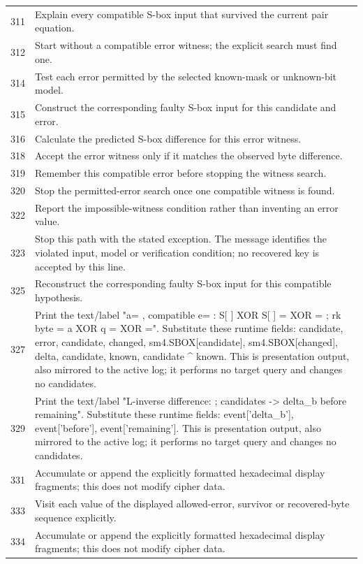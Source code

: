 \begin{longtable}{r >{\raggedright\arraybackslash}p{138mm}}
311&Explain every compatible S-box input that survived the current pair equation.\\
312&Start without a compatible error witness; the explicit search must find one.\\
314&Test each error permitted by the selected known-mask or unknown-bit model.\\
315&Construct the corresponding faulty S-box input for this candidate and error.\\
316&Calculate the predicted S-box difference for this error witness.\\
318&Accept the error witness only if it matches the observed byte difference.\\
319&Remember this compatible error before stopping the witness search.\\
320&Stop the permitted-error search once one compatible witness is found.\\
322&Report the impossible-witness condition rather than inventing an error value.\\
323&Stop this path with the stated exception. The message identifies the violated input, model or verification condition; no recovered key is accepted by this line.\\
325&Reconstruct the corresponding faulty S-box input for this compatible hypothesis.\\
327&Print the text/label "a= , compatible e= : S[ ] XOR S[ ] =   XOR   =  ; rk byte = a XOR q =   XOR   =". Substitute these runtime fields: candidate, error, candidate, changed, sm4.SBOX[candidate], sm4.SBOX[changed], delta, candidate, known, candidate \textasciicircum{} known. This is presentation output, also mirrored to the active log; it performs no target query and changes no candidates.\\
329&Print the text/label "L-inverse difference:  ; candidates   ->  delta\_b before remaining". Substitute these runtime fields: event['delta\_b'], event['before'], event['remaining']. This is presentation output, also mirrored to the active log; it performs no target query and changes no candidates.\\
331&Accumulate or append the explicitly formatted hexadecimal display fragments; this does not modify cipher data.\\
333&Visit each value of the displayed allowed-error, survivor or recovered-byte sequence explicitly.\\
334&Accumulate or append the explicitly formatted hexadecimal display fragments; this does not modify cipher data.\\

\end{longtable}
